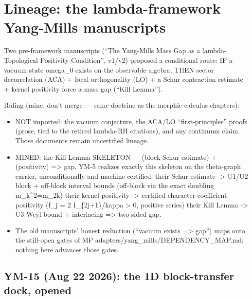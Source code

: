 \hypertarget{lineage-the-lambda-framework-yang-mills-manuscripts}{%
\chapter{Lineage: the lambda-framework Yang-Mills manuscripts}\label{lineage-the-lambda-framework-yang-mills-manuscripts}}

Two pre-framework manuscripts (``The Yang-Mills Mass Gap as a
lambda-Topological Positivity Condition'', v1/v2) proposed a conditional
route: IF a vacuum state omega\_0 exists on the observable algebra, THEN
sector decorrelation (ACA) + local orthogonality (LO) + a Schur contraction
estimate + kernel positivity force a mass gap (``Kill Lemma'').

Ruling (mine, don't merge --- same doctrine as the morphic-calculus chapters):

\begin{itemize}
\tightlist
\item
  NOT imported: the vacuum conjecture, the ACA/LO ``first-principles'' proofs
  (prose, tied to the retired lambda-RH citations), and any continuum claim.
  Those documents remain uncertified lineage.
\item
  MINED: the Kill-Lemma SKELETON --- (block Schur estimate) + (positivity)
  =\textgreater{} gap. YM-5 realizes exactly this skeleton on the theta-graph carrier,
  unconditionally and machine-certified:
  their Schur estimate -\textgreater{} U1/U2 block + off-block interval bounds
  (off-block via the exact doubling m\_k\^{}2=m\_2k)
  their kernel positivity -\textgreater{} certified character-coefficient positivity
  (f\_j = 2 I\_\{2j+1\}/kappa \textgreater{} 0, positive series)
  their Kill Lemma -\textgreater{} U3 Weyl bound + interlacing =\textgreater{} two-sided gap.
\item
  The old manuscripts' honest reduction (``vacuum exists =\textgreater{} gap'') maps onto
  the still-open gates of MP adapters/yang\_mills/DEPENDENCY\_MAP.md; nothing
  here advances those gates.
\end{itemize}

\hypertarget{ym-15-aug-22-2026-the-1d-block-transfer-dock-opened}{%
\section{YM-15 (Aug 22 2026): the 1D block-transfer dock, opened}\label{ym-15-aug-22-2026-the-1d-block-transfer-dock-opened}}

